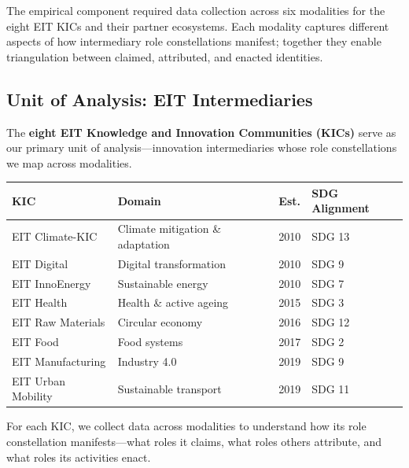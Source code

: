 \documentclass[../main.tex]{subfiles}
\begin{document}
The empirical component required data collection across six modalities for the eight EIT KICs and their partner ecosystems. Each modality captures different aspects of how intermediary role constellations manifest; together they enable triangulation between claimed, attributed, and enacted identities.

\subsection{Unit of Analysis: EIT Intermediaries}

The \textbf{eight EIT Knowledge and Innovation Communities (KICs)} serve as our primary unit of analysis---innovation intermediaries whose role constellations we map across modalities.

\begin{center}
\small
\begin{tabular}{@{}llcl@{}}
\toprule
\textbf{KIC} & \textbf{Domain} & \textbf{Est.} & \textbf{SDG Alignment} \\
\midrule
EIT Climate-KIC & Climate mitigation \& adaptation & 2010 & SDG 13 \\
EIT Digital & Digital transformation & 2010 & SDG 9 \\
EIT InnoEnergy & Sustainable energy & 2010 & SDG 7 \\
EIT Health & Health \& active ageing & 2015 & SDG 3 \\
EIT Raw Materials & Circular economy & 2016 & SDG 12 \\
EIT Food & Food systems & 2017 & SDG 2 \\
EIT Manufacturing & Industry 4.0 & 2019 & SDG 9 \\
EIT Urban Mobility & Sustainable transport & 2019 & SDG 11 \\
\bottomrule
\end{tabular}
\end{center}

For each KIC, we collect data across modalities to understand how its role constellation manifests---what roles it claims, what roles others attribute, and what roles its activities enact.
\end{document}

